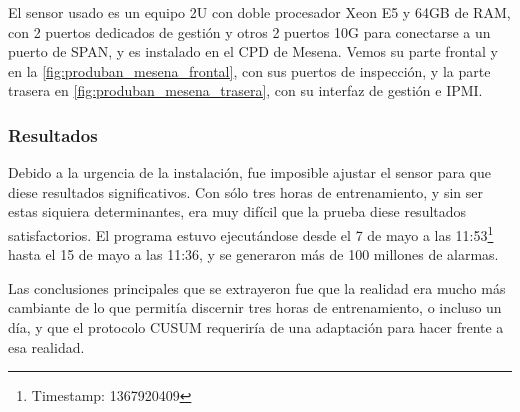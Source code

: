 El sensor usado es un equipo 2U con doble procesador Xeon E5 y 64GB de RAM, con 2 puertos dedicados de gestión y otros 
2 puertos 10G para conectarse a un puerto de SPAN, y es instalado en el CPD de Mesena. Vemos su parte frontal y
en la \autoref{fig:produban_mesena_frontal}, con sus puertos de inspección, y la parte trasera en
\autoref{fig:produban_mesena_trasera}, con su interfaz de gestión e IPMI.


\subsubsection{Resultados}
Debido a la urgencia de la instalación, fue imposible ajustar el sensor para que diese resultados significativos. Con 
sólo tres horas de entrenamiento, y sin ser estas siquiera determinantes, era muy difícil que la prueba diese 
resultados satisfactorios. El programa estuvo ejecutándose desde el 7 de mayo a las 
11:53\footnote{Timestamp: 1367920409} hasta el 15 de mayo a las 11:36, y se generaron más de 100 millones de alarmas.

Las conclusiones principales que se extrayeron fue que la realidad era mucho más cambiante de lo que permitía discernir
tres horas de entrenamiento, o incluso un día, y que el protocolo CUSUM requeriría de una adaptación para hacer frente a esa
realidad.

\endinput

